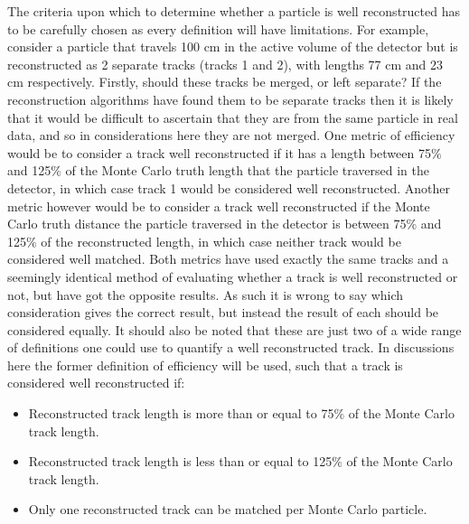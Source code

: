 The criteria upon which to determine whether a particle is well reconstructed has to be carefully chosen as every definition will have limitations. For example, consider a particle that travels 100 cm in the active volume of the detector but is reconstructed as 2 separate tracks (tracks 1 and 2), with lengths 77 cm and 23 cm respectively. Firstly, should these tracks be merged, or left separate? If the reconstruction algorithms have found them to be separate tracks then it is likely that it would be difficult to ascertain that they are from the same particle in real data, and so in considerations here they are not merged. One metric of efficiency would be to consider a track well reconstructed if it has a length between 75$\%$ and 125$\%$ of the Monte Carlo truth length that the particle traversed in the detector, in which case track 1 would be considered well reconstructed. Another metric however would be to consider a track well reconstructed if the Monte Carlo truth distance the particle traversed in the detector is between 75$\%$ and 125$\%$ of the reconstructed length, in which case neither track would be considered well matched. Both metrics have used exactly the same tracks and a seemingly identical method of evaluating whether a track is well reconstructed or not, but have got the opposite results. As such it is wrong to say which consideration gives the correct result, but instead the result of each should be considered equally. It should also be noted that these are just two of a wide range of definitions one could use to quantify a well reconstructed track. In discussions here the former definition of efficiency will be used, such that a track is considered well reconstructed if:
\begin{itemize}
\item Reconstructed track length is more than or equal to 75$\%$ of the Monte Carlo track length.
\item Reconstructed track length is less than or equal to 125$\%$ of the Monte Carlo track length.
\item Only one reconstructed track can be matched per Monte Carlo particle.
\end{itemize}

